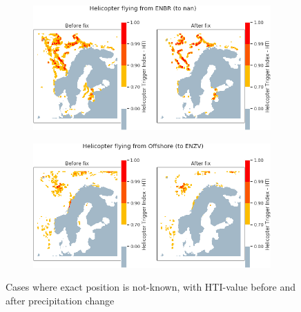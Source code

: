 \begin{figure}[H]
    \begin{subfigure}{0.45\textwidth}
    \centering
    \includegraphics[width=\textwidth]{Figures/Analysis04.png}
    \caption{}
    \label{fig:HTIA04}
    \end{subfigure}
\hfill
    \begin{subfigure}{0.45\textwidth}
    \centering
    \includegraphics[width=\textwidth]{Figures/Analysis05.png}
    \caption{}
    \label{fig:HTIA05}
    \end{subfigure}
\caption{Cases where exact position is not-known, with HTI-value before and after precipitation change}
\end{figure}

